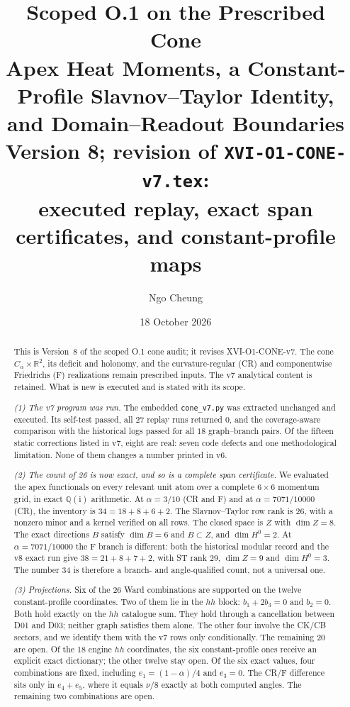 \documentclass[11pt,a4paper]{article}
\title{\textbf{Scoped O.1 on the Prescribed Cone}\\[5pt]
\Large Apex Heat Moments, a Constant-Profile
Slavnov--Taylor Identity, and Domain--Readout Boundaries\\[5pt]
\large Version 8; revision of \texttt{XVI-O1-CONE-v7.tex}:\\
executed replay, exact span certificates, and constant-profile maps}
\author{Ngo Cheung}
\date{18 October 2026}
\newcommand{\RR}{\mathbb R}
\newcommand{\ii}{\mathrm i}
\newcommand{\loc}[1]{\nolinkurl{#1}}
\theoremstyle{plain}
\theoremstyle{definition}
\theoremstyle{remark}
\numberwithin{equation}{section}
\begin{document}
\maketitle

\begin{abstract}
This is Version~8 of the scoped O.1 cone audit; it revises
XVI-O1-CONE-v7. The cone \(C_\alpha\times\RR^2\), its deficit and
holonomy, and the curvature-regular (CR) and componentwise
Friedrichs (F) realizations remain prescribed inputs.
The v7 analytical content is retained. What is new is executed
and is stated with its scope.

\emph{(1) The v7 program was run.} The embedded \loc{cone_v7.py}
was extracted unchanged and executed. Its self-test passed, all
27 replay runs returned 0, and the coverage-aware comparison with
the historical logs passed for all \(18\) graph--branch pairs.
Of the fifteen static corrections listed in v7, eight are real:
seven code defects and one methodological limitation. None of them changes a number printed in v6.

\emph{(2) The count of 26 is now exact, and so is a complete span
certificate.} We evaluated the apex functionals on every
relevant unit atom over a complete \(6\times6\) momentum grid,
in exact \(\mathbb Q(\ii)\) arithmetic. At
\(\alpha=3/10\) (CR and F) and at \(\alpha=7071/10000\) (CR), the
inventory is \(34=18+8+6+2\). The Slavnov--Taylor row rank is
\(26\), with a nonzero minor and a kernel verified on all rows.
The closed space is \(Z\) with \(\dim Z=8\). The exact directions
\(B\) satisfy \(\dim B=6\) and \(B\subset Z\), and
\(\dim H^0=2\). At \(\alpha=7071/10000\) the F branch is different:
both the historical modular record and the v8 exact run give
\(38=21+8+7+2\), with ST rank \(29\), \(\dim Z=9\) and
\(\dim H^0=3\).
The number 34 is therefore a branch- and angle-qualified count,
not a universal one.

\emph{(3) Projections.} Six of the 26 Ward combinations are
supported on the twelve constant-profile coordinates.
Two of them lie in the \(hh\) block: \(b_1+2b_3=0\) and \(b_2=0\).
Both hold exactly on the \(hh\) catalogue sum. They hold through
a cancellation between D01 and D03; neither graph satisfies them
alone. The other four involve the CK/CB sectors, and we identify
them with the v7 rows only conditionally. The remaining 20 are
open.
Of the 18 engine \(hh\) coordinates, the six constant-profile
ones receive an explicit exact dictionary; the other twelve stay
open.
Of the six exact values, four combinations are fixed, including
\(e_1=(1-\alpha)/4\) and \(e_3=0\). The CR/F difference sits only
in \(e_4+e_5\), where it equals \(\nu/8\) exactly at both
computed angles. The remaining two
combinations are open.


\end{abstract}
\end{document}
